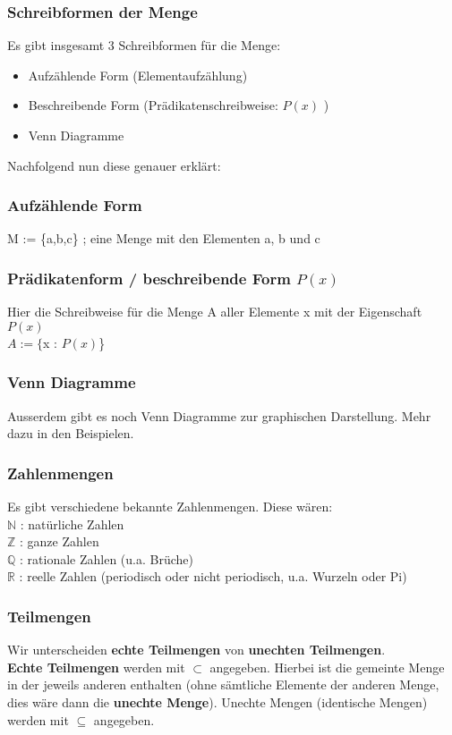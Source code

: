 \documentclass[a4paper,12pt]{article}
\begin{document}
\subsubsection{Schreibformen der Menge}
Es gibt insgesamt 3 Schreibformen für die Menge:
\begin{itemize}
  \item Aufzählende Form (Elementaufzählung)
  \item Beschreibende Form (Prädikatenschreibweise: \( P(x) \) )
  \item Venn Diagramme
\end{itemize}

Nachfolgend nun diese genauer erklärt:

\subsubsection{Aufzählende Form}
M := \{a,b,c\} ; eine Menge mit den Elementen a, b und c

\subsubsection{Prädikatenform / beschreibende Form \( P(x) \)}
Hier die Schreibweise für die Menge A aller Elemente x mit der Eigenschaft \( P(x) \) \\
$A := \{$x : \( P(x) \)\} \\

\subsubsection{Venn Diagramme}
Ausserdem gibt es noch Venn Diagramme zur graphischen Darstellung. Mehr dazu in den Beispielen.

\subsubsection{Zahlenmengen}
Es gibt verschiedene bekannte Zahlenmengen. Diese wären: \\
$\mathbb{N}$ : natürliche Zahlen \\
$\mathbb{Z}$ : ganze Zahlen \\
$\mathbb{Q}$ : rationale Zahlen (u.a. Brüche) \\
$\mathbb{R}$ : reelle Zahlen (periodisch oder nicht periodisch, u.a. Wurzeln oder Pi)

\subsubsection{Teilmengen}
Wir unterscheiden \textbf{echte Teilmengen} von \textbf{unechten Teilmengen}. \\
\textbf{Echte Teilmengen} werden mit $\subset$ angegeben. Hierbei ist die gemeinte Menge in der jeweils anderen enthalten (ohne \textnormal{sämtliche} Elemente der anderen Menge, dies \textnormal{wäre} dann die \textbf{unechte Menge}). Unechte Mengen (identische Mengen) werden mit $\subseteq$ angegeben.
\end{document}
